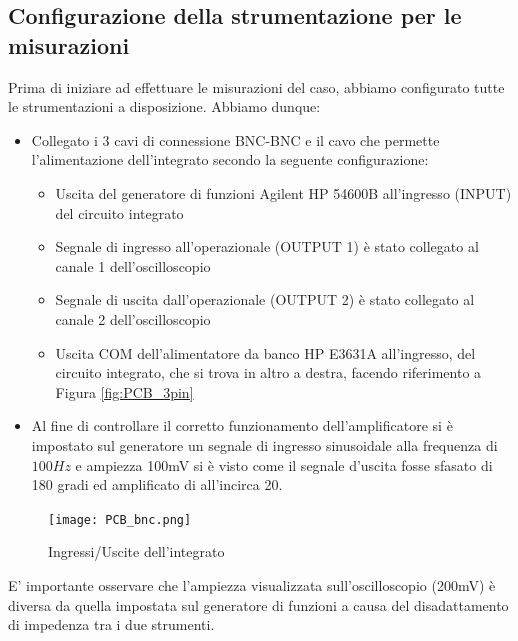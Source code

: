 \subsection{Configurazione della strumentazione per le misurazioni}
Prima di iniziare ad effettuare le misurazioni del caso, abbiamo configurato tutte le strumentazioni a disposizione. Abbiamo dunque:
\begin{itemize}
    \item Collegato i 3 cavi di connessione BNC-BNC e il cavo che permette l'alimentazione dell'integrato secondo la seguente configurazione:
    \begin{itemize}
        \item Uscita del generatore di funzioni Agilent HP 54600B all'ingresso (INPUT) del circuito integrato
        \item  Segnale di ingresso all'operazionale (OUTPUT 1) è stato collegato al canale 1 dell'oscilloscopio
        \item  Segnale di uscita dall'operazionale (OUTPUT 2) è stato collegato al canale 2 dell'oscilloscopio
        \item Uscita COM dell'alimentatore da banco HP E3631A all'ingresso, del circuito integrato, che si trova in altro a destra, facendo riferimento a Figura \ref{fig:PCB_3pin}
    \end{itemize}
    \item Al fine di controllare il corretto funzionamento dell'amplificatore si è impostato sul generatore un segnale di ingresso sinusoidale alla frequenza di $100Hz$ e ampiezza 100mV si è visto come il segnale d'uscita fosse sfasato di 180 gradi ed amplificato di all'incirca 20.  
\end{itemize}
\begin{figure}[h]
        \centering
        \texttt{[image: PCB\_bnc.png]}
        \caption{Ingressi/Uscite dell'integrato}
        \label{fig:pcb_bnc}
    \end{figure}
\FloatBarrier
E' importante osservare che l'ampiezza visualizzata sull'oscilloscopio (200mV) è diversa da quella impostata sul generatore di funzioni a causa del disadattamento di impedenza tra i due strumenti.
